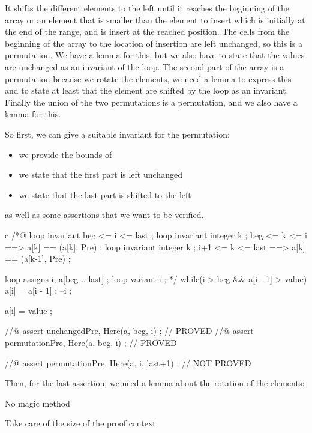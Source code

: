 It shifts the different elements to the left until it reaches the beginning of
the array or an element that is smaller than the element to insert which is
initially at the end of the range, and is insert at the reached position. The
cells from the beginning of the array to the location of insertion are left
unchanged, so this is a permutation. We have a lemma for this, but we also have
to state that the values are unchanged as an invariant of the loop. The second
part of the array is a permutation because we rotate the elements, we need a
lemma to express this and to state at least that the element are shifted by the
loop as an invariant. Finally the union of the two permutations is a
permutation, and we also have a lemma for this.



So first, we can give a suitable invariant for the permutation:

\begin{itemize}
\item we provide the bounds of 
\item we state that the first part is left unchanged
\item we state that the last part is shifted to the left
\end{itemize}

as well as some assertions that we want to be verified.



\begin{CodeBlock}{c}
  /*@
    loop invariant beg <= i <= last ;
    loop invariant \forall integer k ; beg <= k <= i    ==> a[k] == \at(a[k], Pre) ;
    loop invariant \forall integer k ; i+1 <= k <= last ==> a[k] == \at(a[k-1], Pre) ;

    loop assigns i, a[beg .. last] ;
    loop variant i ;
  */
  while(i > beg && a[i - 1] > value){
    a[i] = a[i - 1] ;
    --i ;
  }

  a[i] = value ;

  //@ assert unchanged{Pre, Here}(a, beg, i) ;   // PROVED
  //@ assert permutation{Pre, Here}(a, beg, i) ; // PROVED

  //@ assert permutation{Pre, Here}(a, i, last+1) ; // NOT PROVED
\end{CodeBlock}


Then, for the last assertion, we need a lemma about the rotation of the
elements:





No magic method

Take care of the size of the proof context

